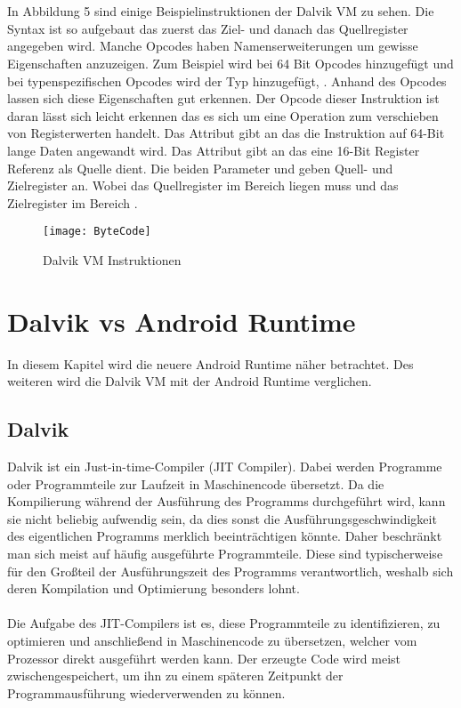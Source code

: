 \documentclass[11pt,conference,a4paper]{IEEEtran}
\begin{document}
\\
\\
In Abbildung 5 sind einige Beispielinstruktionen der Dalvik VM zu sehen. Die Syntax ist so aufgebaut das zuerst das Ziel- und danach das Quellregister angegeben wird. Manche Opcodes haben Namenserweiterungen um gewisse Eigenschaften anzuzeigen. Zum Beispiel wird bei 64 Bit Opcodes  hinzugefügt und bei typenspezifischen Opcodes wird der Typ hinzugefügt, .
Anhand des  Opcodes lassen sich diese Eigenschaften gut erkennen. Der Opcode dieser Instruktion ist  daran lässt sich leicht erkennen das es sich um eine Operation zum verschieben von Registerwerten handelt. Das Attribut  gibt an das die Instruktion auf 64-Bit lange Daten angewandt wird. Das Attribut  gibt an das eine 16-Bit Register Referenz als Quelle dient. Die beiden Parameter  und  geben Quell- und Zielregister an. Wobei das Quellregister im Bereich  liegen muss und das Zielregister im Bereich .

\begin{figure*}
\centering
\texttt{[image: ByteCode]}
\caption{Dalvik VM Instruktionen\cite{2}}
\label{fig:ByteCode}
\end{figure*}


\section{Dalvik vs Android Runtime}
In diesem Kapitel wird die neuere Android Runtime näher betrachtet. Des weiteren wird die Dalvik VM mit der Android Runtime verglichen.

\subsection{Dalvik\cite{8}}
Dalvik ist ein Just-in-time-Compiler (JIT Compiler). Dabei werden Programme oder Programmteile zur Laufzeit in Maschinencode übersetzt. Da die Kompilierung während der Ausführung des Programms durchgeführt wird, kann sie nicht beliebig aufwendig sein, da dies sonst die Ausführungsgeschwindigkeit des eigentlichen Programms merklich beeinträchtigen könnte. Daher beschränkt man sich meist auf häufig ausgeführte Programmteile. Diese sind typischerweise für den Großteil der Ausführungszeit des Programms verantwortlich, weshalb sich deren Kompilation und Optimierung besonders lohnt.
\\
\\
Die Aufgabe des JIT-Compilers ist es, diese Programmteile zu identifizieren, zu optimieren und anschließend in Maschinencode zu übersetzen, welcher vom Prozessor direkt ausgeführt werden kann. Der erzeugte Code wird meist zwischengespeichert, um ihn zu einem späteren Zeitpunkt der Programmausführung wiederverwenden zu können.
\end{document}
